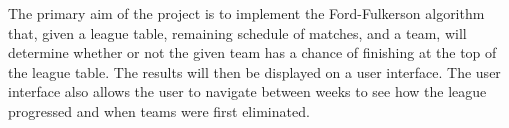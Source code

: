 The primary aim of the project is to implement the
Ford-Fulkerson algorithm that, given a league table, remaining schedule of
matches, and a team, will determine whether or not the given team has a
chance of finishing at the top of the league table. The results will then
be displayed on a user interface. The user interface also allows the user to 
navigate between weeks to see how the league progressed and when teams were 
first eliminated.